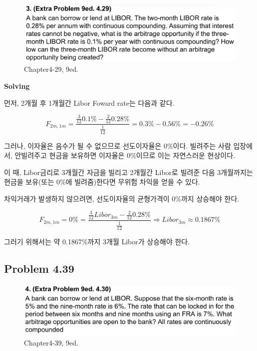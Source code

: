\documentclass[
  letterpaper,
  DIV=11,
  numbers=noendperiod]{scrreprt}
\begin{document}
\begin{figure}[H]

{\centering \includegraphics{images/선물옵션_4-29.png}

}

\caption{Chapter4-29, 9ed.}

\end{figure}%

\textbf{Solving}

먼저, 2개월 후 1개월간 Libor Foward rate는 다음과 같다.

\[F_{2m,1m}=\frac{\frac{3}{12}0.1\%-\frac{2}{12}0.28\%}{\frac{1}{12}}=0.3\%-0.56\%=-0.26\%\]

그러나, 이자율은 음수가 될 수 없으므로 선도이자율은 0\%이다. 빌려주는
사람 입장에서, 안빌려주고 현금을 보유하면 이자율은 0\%이므로 이는
자연스러운 현상이다.

이 때, Libor금리로 3개월간 자금을 빌리고 2개월간 Libor로 빌려준 다음
3개월까지는 현금을 보유(또는 0\%에 빌려줌)한다면 무위험 차익을 얻을 수
있다.

차익거래가 발생하지 않으려면, 선도이자율의 균형가격이 0\%까지 상승해야
한다.

\[F_{2m,1m}=0\%=\frac{\frac{3}{12}Libor_{3m}-\frac{2}{12}0.28\%}{\frac{1}{12}}\Rightarrow Libor_{3m}\approx 0.1867\%\]

그러기 위해서는 약 0.1867\%까지 3개월 Libor가 상승해야 한다.

\subsection*{\texorpdfstring{\textbf{Problem
4.39}}{Problem 4.39}}\label{problem-4.39}

\begin{figure}[H]

{\centering \includegraphics{images/선물옵션_4-30.png}

}

\caption{Chapter4-39, 9ed.}

\end{figure}%
\end{document}
